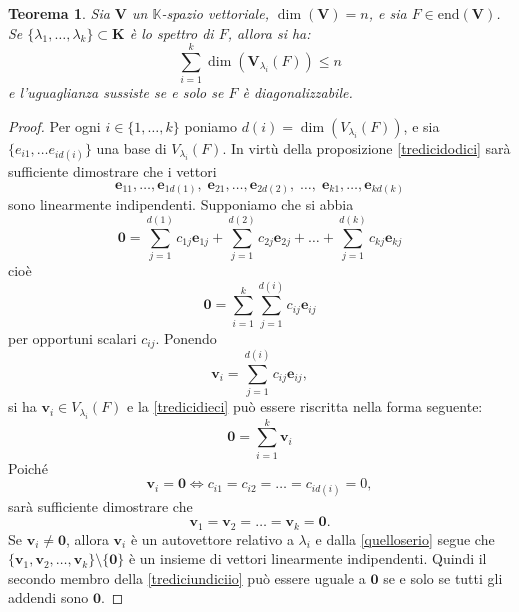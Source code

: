 \documentclass{article}
\theoremstyle{plain}
\newtheorem{thm}{Teorema}[section]
\theoremstyle{definition}
\theoremstyle{remark}
\begin{document}
\vspace{10pt}

\begin{bxthm}
\begin{thm}\label{tredicitredici}
Sia $\mathbf{V}$ un $\mathbb{K}$-spazio vettoriale, $\dim(\mathbf{V}) = n$, e sia $F \in \mathrm{end}(\mathbf{V})$.
Se $\{\lambda_1, \ldots, \lambda_k\} \subset \mathbf{K}$ è lo spettro di $F$, allora si ha:
\begin{equation}\label{tredicinove}
    \sum_{i=1}^{k}\dim(\mathbf{V}_{\lambda_i}(F))\leq n
\end{equation}
e l'uguaglianza sussiste se e solo se $F$ è diagonalizzabile.    
\end{thm}
\end{bxthm}
\begin{proof}
Per ogni $i \in\{1,\ldots,k\}$ poniamo $d(i) = \dim(V_{\lambda_i}(F))$, e sia $\{e_{i1}, \ldots e_{id(i)}\}$ una base di $V_{\lambda_i}(F)$. 
In virtù della proposizione \ref{tredicidodici} sarà sufficiente dimostrare che i vettori
\[\mathbf{e}_{11}, \ldots, \mathbf{e}_{1d(1)},\; \mathbf{e}_{21}, \ldots, \mathbf{e}_{2d(2)},\; \ldots,\; \mathbf{e}_{k1}, \ldots, \mathbf{e}_{kd(k)}\]
sono linearmente indipendenti.
Supponiamo che si abbia
\[ \mathbf{0} = \sum_{j=1}^{d(1)}c_{1j}\mathbf{e}_{1j}+\sum_{j=1}^{d(2)}c_{2j}\mathbf{e}_{2j}+\ldots+\sum_{j=1}^{d(k)}c_{kj}\mathbf{e}_{kj} \]
cioè
\begin{equation}\label{tredicidieci}
    \mathbf{0} = \sum_{i=1}^{k}\sum_{j=1}^{d(i)}c_{ij}\mathbf{e}_{ij}
\end{equation}
per opportuni scalari $c_{ij}$.
Ponendo 
\[\mathbf{v}_i = \sum_{j=1}^{d(i)}c_{ij}\mathbf{e}_{ij},\]
si ha $\mathbf{v}_i \in V_{\lambda_i}(F)$ e la \ref{tredicidieci} può essere riscritta nella forma seguente:
\begin{equation}\label{trediciundiciio}
\mathbf{0} = \sum_{i=1}^{k}\mathbf{v}_i
\end{equation}
Poiché 
\[\mathbf{v}_i = \mathbf{0}\iff c_{i1} = c_{i2} = \ldots = c_{id(i)} = 0,\]
sarà sufficiente dimostrare che 
\[\mathbf{v}_1 = \mathbf{v}_2 = \ldots = \mathbf{v}_k = \mathbf{0}.\]
Se $\mathbf{v}_i \neq \mathbf{0}$, allora $\mathbf{v}_i$ è un autovettore relativo a $\lambda_i$ e dalla \ref{quelloserio} 
segue che $\{\mathbf{v}_1, \mathbf{v}_2, \ldots, \mathbf{v}_k\} \setminus \{\mathbf{0}\}$ è un insieme di vettori linearmente indipendenti. 
Quindi il secondo membro della \ref{trediciundiciio} può essere uguale a $\mathbf{0}$ se e solo se tutti gli addendi sono $\mathbf{0}$.    
\end{proof}
\end{document}
